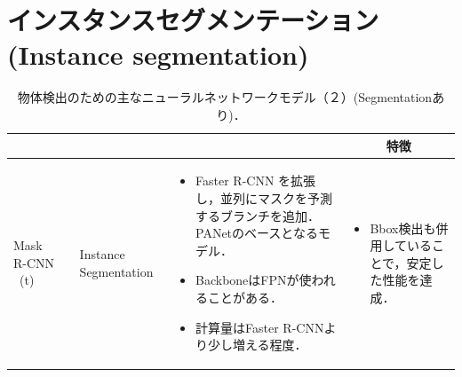 \documentclass[originalpaper]{jsaiart}     %
\begin{document}
\section{インスタンスセグメンテーション(Instance segmentation)}
\begin{table}
    \caption{物体検出のための主なニューラルネットワークモデル（２）(Segmentationあり)．}
    \label{tbl-cheat2}
    \begin{center}
        \setlength{\tabcolsep}{3pt}
        \footnotesize
        \begin{tabularx}{\linewidth}{Xp{1.5cm}Xp{7cm}X} \toprule
            \centering{モデル名称} & \centering{文献} & \centering{用途} & \centering{概要} & \multicolumn{1}{c}{特徴} \\ \midrule

            Mask R-CNN \ (t)\footnote[1] & \cite{HGDG17} & Instance Segmentation & 
            \begin{itemize}
                \vspace{-0.7\baselineskip}
                \setlength{\leftskip}{-3mm}
                \item Faster R-CNN を拡張し，並列にマスクを予測するブランチを追加．PANetのベースとなるモデル．
                \item BackboneはFPNが使われることがある．
                \item 計算量はFaster R-CNNより少し増える程度．
            \end{itemize}
            &
            \begin{itemize}
                \vspace{-0.7\baselineskip}
                \setlength{\leftskip}{-3mm}
                \item Bbox検出も併用していることで，安定した性能を達成．
            \end{itemize}
            \\


\end{tabularx}
\end{center}
\end{table}
\end{document}
